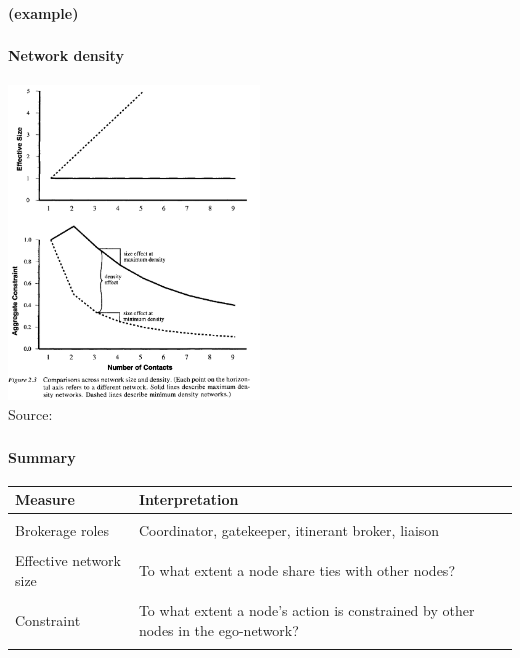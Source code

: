 \documentclass[8pt]{beamer}
\begin{document}
\begin{frame}[fragile]
\frametitle{\insertsection}
\framesubtitle{\insertsubsection \vspace{0.1cm} (example)}



\end{frame}
  


\begin{frame}
\frametitle{\insertsection}
\framesubtitle{Network density}


\centering 
\includegraphics[width = 0.5\textwidth]{burt_density}\\
\tiny{Source: \cite{Burt1992}}

\end{frame}



\begin{frame}
\frametitle{\insertsection}
\framesubtitle{Summary}

\small
\begin{table}
\begin{tabular}{p{3cm}p{7.5cm}}
\toprule
\textbf{Measure}        & \textbf{Interpretation} \\
\hline
\\
Brokerage roles         & Coordinator, gatekeeper, itinerant broker, liaison\\
\\
Effective network size  & To what extent a node share ties with other nodes?\\
\\
Constraint              & To what extent a node's action is constrained by other nodes in the ego-network?\\
\\
\bottomrule
\end{tabular}
\end{table}
\end{frame}
\end{document}
